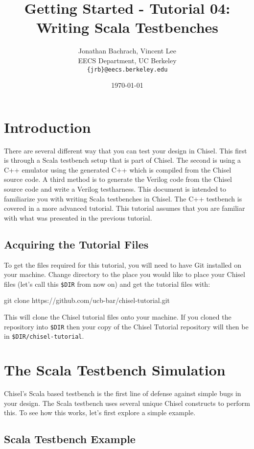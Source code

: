 \documentclass[twocolumn, 10pt]{article}
\title{Getting Started - Tutorial 04: Writing Scala Testbenches}
\author{Jonathan Bachrach, Vincent Lee \\
EECS Department, UC Berkeley\\
{\tt  \{jrb\}@eecs.berkeley.edu}
}
\date{\today}
\begin{document}
\maketitle{}

\section{Introduction}

There are several different way that you can test your design in Chisel. This first is through a Scala testbench setup that is part of Chisel. The second is using a C++ emulator using the generated C++ which is compiled from the Chisel source code. A third method is to generate the Verilog code from the Chisel source code and write a Verilog testharness. This document is intended to familiarize you with writing Scala testbenches in Chisel. The C++ testbench is covered in a more advanced tutorial.  This tutorial assumes that you are familiar with what was presented in the previous tutorial.

\subsection{Acquiring the Tutorial Files}

To get the files required for this tutorial, you will need to have Git installed on your machine. Change directory to the place you would like to place your Chisel files (let's call this \verb+$DIR+ from now on) and get the tutorial files with:

\begin{bash}
git clone https://github.com/ucb-bar/chisel-tutorial.git
\end{bash}

This will clone the Chisel tutorial files onto your machine. If you cloned the repository into \verb+$DIR+ then your copy of the Chisel Tutorial repository will then be in \verb+$DIR/chisel-tutorial+.

\section{The Scala Testbench Simulation}

Chisel's Scala based testbench is the first line of defense against simple bugs in your design. The Scala testbench uses several unique Chisel constructs to perform this. To see how this works, let's first explore a simple example.

\subsection{Scala Testbench Example}
\end{document}

